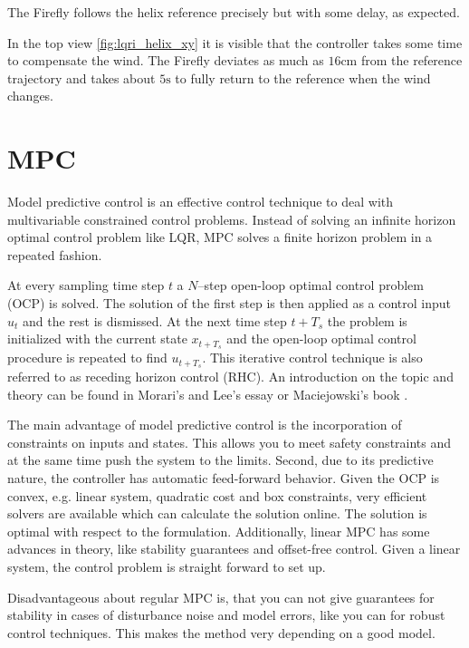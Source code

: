 The Firefly follows the helix reference precisely but with some delay, as expected.

In the top view \ref{fig:lqri_helix_xy} it is visible that the controller takes some time to compensate the wind. The Firefly deviates as much as $16 \si{\centi\metre}$ from the reference trajectory and takes about $5 \si{\second}$ to fully return to the reference when the wind changes.
\section{MPC} 
Model predictive control is an effective control technique to deal with multivariable constrained control problems. Instead of solving an infinite horizon optimal control problem like LQR, MPC solves a finite horizon problem in a repeated fashion. 

At every sampling time step $t$ a $N$--step open-loop optimal control problem (OCP) is solved. The solution of the first step is then applied as a control input $u_t$ and the rest is dismissed. At the next time step $t+T_s$ the problem is initialized with the current state $x_{t+T_s}$ and the open-loop optimal control procedure is repeated to find $u_{t+T_s}$. This iterative control technique is also referred to as receding horizon control (RHC). An introduction on the topic and theory can be found in Morari's and Lee's essay \cite{Morari1999} or Maciejowski's book \cite{Maciejowski2002}.

The main advantage of model predictive control is the incorporation of constraints on inputs and states. This allows you to meet safety constraints and at the same time push the system to the limits. Second, due to its predictive nature, the controller has automatic feed-forward behavior. Given the OCP is convex, e.g. linear system, quadratic cost and box constraints, very efficient solvers are available which can calculate the solution online. The solution is optimal with respect to the formulation. Additionally, linear MPC has some advances in theory, like stability guarantees and offset-free control. Given a linear system, the control problem is straight forward to set up.

Disadvantageous about regular MPC is, that you can not give guarantees for stability in cases of disturbance noise and model errors, like you can for robust control techniques. This makes the method very depending on a good model.

